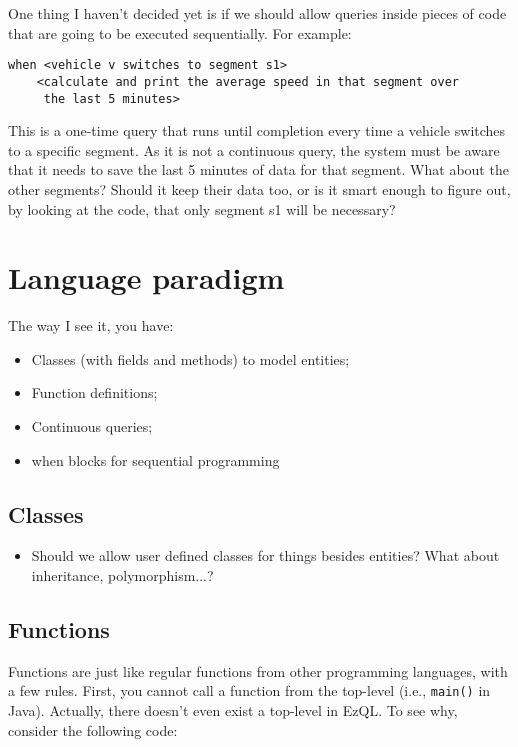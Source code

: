 \documentclass{report}
\begin{document}
One thing I haven't decided yet is if we should allow queries inside
pieces of code that are going to be executed sequentially. For
example:

\begin{verbatim}
when <vehicle v switches to segment s1>
    <calculate and print the average speed in that segment over
     the last 5 minutes>
\end{verbatim}

This is a one-time query that runs until completion every time a
vehicle switches to a specific segment. As it is not a continuous
query, the system must be aware that it needs to save the last 5
minutes of data for that segment. What about the other segments?
Should it keep their data too, or is it smart enough to figure out, by
looking at the code, that only segment s1 will be necessary?

\chapter{Language paradigm}
The way I see it, you have:

\begin{itemize}
\item Classes (with fields and methods) to model entities;
\item Function definitions;
\item Continuous queries;
\item when blocks for sequential programming
\end{itemize}

\section{Classes}

\begin{itemize}
\item Should we allow user defined classes for things besides
  entities? What about inheritance, polymorphism...?
\end{itemize}

\section{Functions}

Functions are just like regular functions from other programming
languages, with a few rules. First, you cannot call a function from
the top-level (i.e., \verb=main()= in Java). Actually, there doesn't
even exist a top-level in EzQL. To see why, consider the following
code:
\end{document}
